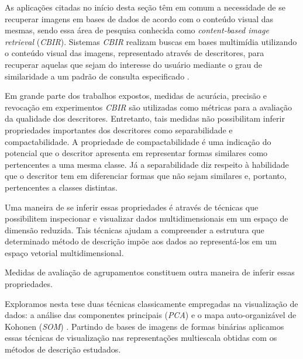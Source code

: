 As aplicações citadas no início desta seção têm em comum a necessidade de se recuperar imagens em bases de dados de acordo com o conteúdo visual das mesmas, sendo essa área de pesquisa conhecida como \textit{content-based image retrieval} (\textit{CBIR}). Sistemas \textit{CBIR} realizam buscas em bases multimídia utilizando o conteúdo visual das imagens, representado através de descritores, para recuperar aquelas que sejam do interesse do usuário mediante o grau de similaridade a um padrão de consulta especificado \cite{Feng:2003}. 

Em grande parte dos trabalhos expostos, medidas de acurácia, precisão e revocação em experimentos \textit{CBIR} são utilizadas como métricas para a avaliação da qualidade dos descritores. Entretanto, tais medidas não possibilitam inferir propriedades importantes dos descritores como separabilidade e compactabilidade. A propriedade de compactabilidade é uma indicação do potencial que o descritor apresenta em representar formas similares como pertencentes a uma mesma classe. Já a separabilidade diz respeito à habilidade que o descritor tem em diferenciar formas que não sejam similares e, portanto, pertencentes a classes distintas. 

Uma maneira de se inferir essas propriedades é através de técnicas que possibilitem inspecionar e visualizar dados multidimensionais em um espaço de dimensão reduzida. Tais técnicas ajudam a compreender a estrutura que determinado método de descrição impõe aos dados ao representá-los em um espaço vetorial multidimensional.

Medidas de avaliação de agrupamentos constituem outra maneira de inferir essas propriedades. 

Exploramos nesta tese duas técnicas classicamente empregadas na visualização de dados: a análise das componentes principais (\emph{PCA}) e o mapa auto-organizável de Kohonen (\textit{SOM}) \cite{Kohonen:1982}. Partindo de bases de imagens de formas binárias aplicamos essas técnicas de visualização nas representações multiescala obtidas com os métodos de descrição estudados.  


